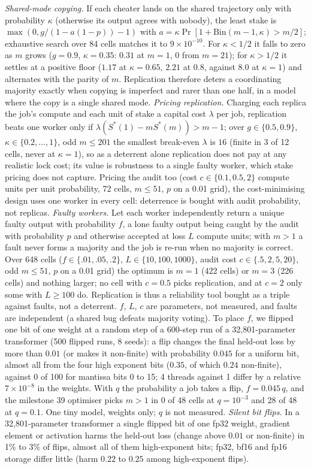 \documentclass[sigconf,anonymous]{acmart}
\begin{document}
 \emph{Shared-mode copying.} If each cheater lands on the shared trajectory only with probability $\kappa$ (otherwise its output agrees with nobody), the least stake is $\max(0,g/(1-a(1-p))-1)$ with $a=\kappa\Pr[1+\mathrm{Bin}(m-1,\kappa)>m/2]$; exhaustive search over 84 cells matches it to $9\times10^{-10}$. For $\kappa<1/2$ it falls to zero as $m$ grows ($g=0.9$, $\kappa=0.35$: $0.31$ at $m=1$, $0$ from $m=21$); for $\kappa>1/2$ it settles at a positive floor ($1.17$ at $\kappa=0.65$, $2.21$ at $0.8$, against $8.0$ at $\kappa=1$) and alternates with the parity of $m$. Replication therefore deters a coordinating majority exactly when copying is imperfect and rarer than one half, in a model where the copy is a single shared mode. \emph{Pricing replication.} Charging each replica the job's compute and each unit of stake a capital cost $\lambda$ per job, replication beats one worker only if $\lambda(S^\ast(1)-mS^\ast(m))>m-1$; over $g\in\{0.5,0.9\}$, $\kappa\in\{0.2,\dots,1\}$, odd $m\le201$ the smallest break-even $\lambda$ is $16$ (finite in 3 of 12 cells, never at $\kappa=1$), so as a deterrent alone replication does not pay at any realistic lock cost; its value is robustness to a single faulty worker, which stake pricing does not capture. Pricing the audit too (cost $c\in\{0.1,0.5,2\}$ compute units per unit probability, 72 cells, $m\le51$, $p$ on a 0.01 grid), the cost-minimising design uses one worker in every cell: deterrence is bought with audit probability, not replicas. \emph{Faulty workers.} Let each worker independently return a unique faulty output with probability $f$, a lone faulty output being caught by the audit with probability $p$ and otherwise accepted at loss $L$ compute units; with $m>1$ a fault never forms a majority and the job is re-run when no majority is correct. Over 648 cells ($f\in\{.01,.05,.2\}$, $L\in\{10,100,1000\}$, audit cost $c\in\{.5,2,5,20\}$, odd $m\le51$, $p$ on a 0.01 grid) the optimum is $m=1$ (422 cells) or $m=3$ (226 cells) and nothing larger; no cell with $c=0.5$ picks replication, and at $c=2$ only some with $L\ge100$ do. Replication is thus a reliability tool bought as a triple against faults, not a deterrent. $f$, $L$, $c$ are parameters, not measured, and faults are independent (a shared bug defeats majority voting). To place $f$, we flipped one bit of one weight at a random step of a 600-step run of a 32,801-parameter transformer (500 flipped runs, 8 seeds): a flip changes the final held-out loss by more than $0.01$ (or makes it non-finite) with probability $0.045$ for a uniform bit, almost all from the four high exponent bits ($0.35$, of which $0.24$ non-finite), against $0$ of 100 for mantissa bits 0 to 15; 4 threads against 1 differ by a relative $7\times10^{-8}$ in the weights. With $q$ the probability a job takes a flip, $f=0.045\,q$, and the milestone 39 optimiser picks $m>1$ in 0 of 48 cells at $q=10^{-3}$ and 28 of 48 at $q=0.1$. One tiny model, weights only; $q$ is not measured. \emph{Silent bit flips.} In a 32,801-parameter transformer a single flipped bit of one fp32 weight, gradient element or activation harms the held-out loss (change above $0.01$ or non-finite) in 1\% to 3\% of flips, almost all of them high-exponent bits; fp32, bf16 and fp16 storage differ little (harm $0.22$ to $0.25$ among high-exponent flips). 
\end{document}
